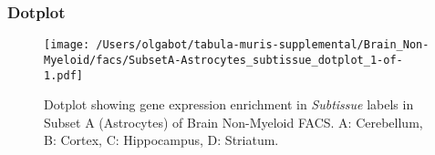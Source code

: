 \clearpage

\subsubsection{Dotplot}
\begin{figure}[h]
\centering
\texttt{[image: /Users/olgabot/tabula-muris-supplemental/Brain\_Non-Myeloid/facs/SubsetA-Astrocytes\_subtissue\_dotplot\_1-of-1.pdf]}

\caption{ Dotplot  showing gene expression enrichment in \emph{Subtissue} labels in Subset A (Astrocytes) of Brain Non-Myeloid FACS. A: Cerebellum, B: Cortex, C: Hippocampus, D: Striatum.}
\end{figure}

